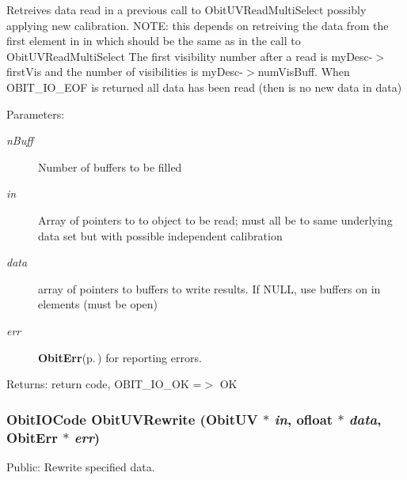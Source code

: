Retreives data read in a previous call to Obit\-UVRead\-Multi\-Select possibly applying new calibration. NOTE: this depends on retreiving the data from the first element in in which should be the same as in the call to Obit\-UVRead\-Multi\-Select The first visibility number after a read is my\-Desc-$>$first\-Vis and the number of visibilities is my\-Desc-$>$num\-Vis\-Buff. When OBIT\_\-IO\_\-EOF is returned all data has been read (then is no new data in data) \begin{Desc}
\item[Parameters:]
\begin{description}
\item[{\em n\-Buff}]Number of buffers to be filled \item[{\em in}]Array of pointers to to object to be read; must all be to same underlying data set but with possible independent calibration \item[{\em data}]array of pointers to buffers to write results. If NULL, use buffers on in elements (must be open) \item[{\em err}]{\bf Obit\-Err}{\rm (p.\,\pageref{structObitErr})} for reporting errors. \end{description}
\end{Desc}
\begin{Desc}
\item[Returns:]return code, OBIT\_\-IO\_\-OK =$>$ OK \end{Desc}
\subsubsection{\setlength{\rightskip}{0pt plus 5cm}Obit\-IOCode Obit\-UVRewrite ({\bf Obit\-UV} $\ast$ {\em in}, {\bf ofloat} $\ast$ {\em data}, {\bf Obit\-Err} $\ast$ {\em err})}\label{ObitUV_8h_a44}


Public: Rewrite specified data. 

